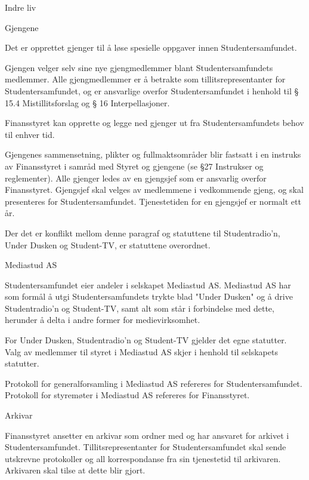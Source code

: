 \begin{lovkapittel}{Indre liv}

  \begin{lovparagraf}{Gjengene}
  
Det er opprettet gjenger til å løse spesielle oppgaver innen Studentersamfundet.

Gjengen velger selv sine nye gjengmedlemmer blant Studentersamfundets medlemmer. Alle gjengmedlemmer er å
betrakte som tillitsrepresentanter for Studentersamfundet, og er ansvarlige overfor Studentersamfundet i henhold til §
15.4 Mistillitsforslag og § 16 Interpellasjoner.

Finansstyret kan opprette og legge ned gjenger ut fra Studentersamfundets behov til enhver tid.

Gjengenes sammensetning, plikter og fullmaktsområder blir fastsatt i en instruks av Finansstyret i samråd med Styret
og gjengene (se §27 Instrukser og reglementer). Alle gjenger ledes av en gjengsjef som er ansvarlig overfor
Finansstyret. Gjengsjef skal velges av medlemmene i vedkommende gjeng, og skal presenteres for
Studentersamfundet. Tjenestetiden for en gjengsjef er normalt ett år.

Der det er konflikt mellom denne paragraf og statuttene til Studentradio'n, Under Dusken og Student-TV, er statuttene
overordnet.

  \end{lovparagraf}
  
  \begin{lovparagraf}{Mediastud AS}
  
Studentersamfundet eier andeler i selskapet Mediastud AS. Mediastud AS har som formål å utgi Studentersamfundets
trykte blad "Under Dusken" og å drive Studentradio’n og Student-TV, samt alt som står i forbindelse med dette,
herunder å delta i andre former for medievirksomhet.

For Under Dusken, Studentradio’n og Student-TV gjelder det egne statutter. Valg av medlemmer til styret i Mediastud
AS skjer i henhold til selskapets statutter.

Protokoll for generalforsamling i Mediastud AS refereres for Studentersamfundet. Protokoll for styremøter i
Mediastud AS refereres for Finansstyret.

  \end{lovparagraf}
  
  \begin{lovparagraf}{Arkivar}
  
Finansstyret ansetter en arkivar som ordner med og har ansvaret for arkivet i Studentersamfundet. Tillitsrepresentanter
for Studentersamfundet skal sende utskrevne protokoller og all korrespondanse fra sin tjenestetid til arkivaren.
Arkivaren skal tilse at dette blir gjort.
  

\end{lovparagraf}
\end{lovkapittel}
